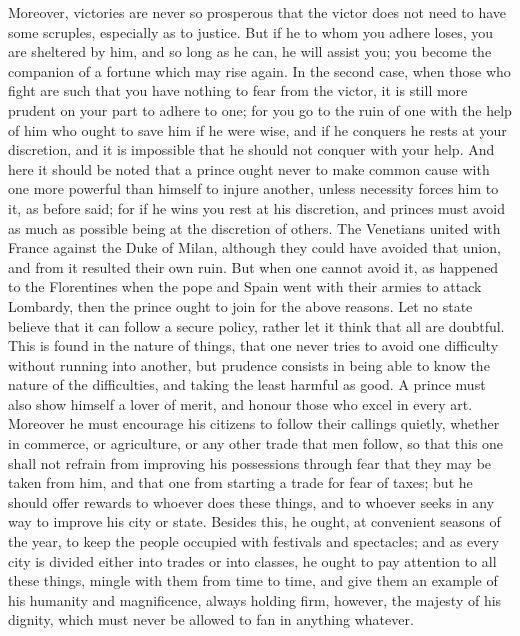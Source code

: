 \documentclass[12pt,letterpaper]{memoir}
\begin{document}
Moreover, victories are never so prosperous that the victor does not
need to have some scruples, especially as to justice. But if he to whom
you adhere loses, you are sheltered by him, and so long as he can, he
will assist you; you become the companion of a fortune which may rise
again. In the second case, when those who fight are such that you have
nothing to fear from the victor, it is still more prudent on your part
to adhere to one; for you go to the ruin of one with the help of him
who ought to save him if he were wise, and if he conquers he rests
at your discretion, and it is impossible that he should not conquer
with your help. And here it should be noted that a prince ought never
to make common cause with one more powerful than himself to injure
another, unless necessity forces him to it, as before said; for if he
wins you rest at his discretion, and princes must avoid as much as
possible being at the discretion of others. The Venetians united with
France against the Duke of Milan, although they could have avoided that
union, and from it resulted their own ruin. But when one cannot avoid
it, as happened to the Florentines when the pope and Spain went with
their armies to attack Lombardy, then the prince ought to join for the
above reasons. Let no state believe that it can follow a secure policy,
rather let it think that all are doubtful. This is found in the nature
of things, that one never tries to avoid one difficulty without running
into another, but prudence consists in being able to know the nature of
the difficulties, and taking the least harmful as good. A prince must
also show himself a lover of merit, and honour those who excel in every
art. Moreover he must encourage his citizens to follow their callings
quietly, whether in commerce, or agriculture, or any other trade that
men follow, so that this one shall not refrain from improving his
possessions through fear that they may be taken from him, and that one
from starting a trade for fear of taxes; but he should offer rewards to
whoever does these things, and to whoever seeks in any way to improve
his city or state. Besides this, he ought, at convenient seasons of the
year, to keep the people occupied with festivals and spectacles; and
as every city is divided either into trades or into classes, he ought
to pay attention to all these things, mingle with them from time to
time, and give them an example of his humanity and magnificence, always
holding firm, however, the majesty of his dignity, which must never be
allowed to fan in anything whatever.
\end{document}
